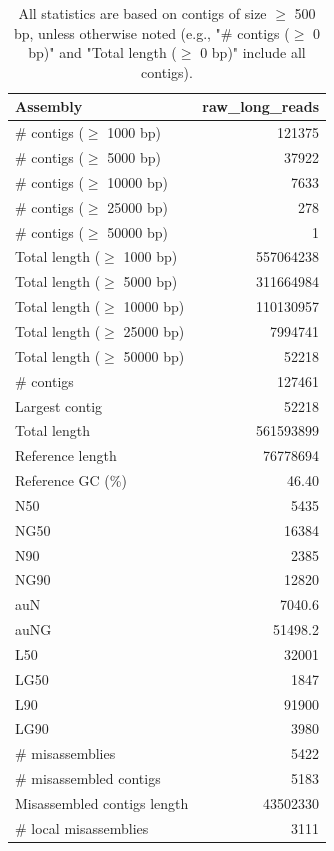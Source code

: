 \documentclass[12pt,a4paper]{article}
\begin{document}
\begin{table}[ht]
\begin{center}
\caption{All statistics are based on contigs of size $\geq$ 500 bp, unless otherwise noted (e.g., "\# contigs ($\geq$ 0 bp)" and "Total length ($\geq$ 0 bp)" include all contigs).}
\begin{tabular}{|l*{1}{|r}|}
\hline
Assembly & raw\_long\_reads \\ \hline
\# contigs ($\geq$ 1000 bp) & 121375 \\ \hline
\# contigs ($\geq$ 5000 bp) & 37922 \\ \hline
\# contigs ($\geq$ 10000 bp) & 7633 \\ \hline
\# contigs ($\geq$ 25000 bp) & 278 \\ \hline
\# contigs ($\geq$ 50000 bp) & 1 \\ \hline
Total length ($\geq$ 1000 bp) & 557064238 \\ \hline
Total length ($\geq$ 5000 bp) & 311664984 \\ \hline
Total length ($\geq$ 10000 bp) & 110130957 \\ \hline
Total length ($\geq$ 25000 bp) & 7994741 \\ \hline
Total length ($\geq$ 50000 bp) & 52218 \\ \hline
\# contigs & 127461 \\ \hline
Largest contig & 52218 \\ \hline
Total length & 561593899 \\ \hline
Reference length & 76778694 \\ \hline
Reference GC (\%) & 46.40 \\ \hline
N50 & 5435 \\ \hline
NG50 & 16384 \\ \hline
N90 & 2385 \\ \hline
NG90 & 12820 \\ \hline
auN & 7040.6 \\ \hline
auNG & 51498.2 \\ \hline
L50 & 32001 \\ \hline
LG50 & 1847 \\ \hline
L90 & 91900 \\ \hline
LG90 & 3980 \\ \hline
\# misassemblies & 5422 \\ \hline
\# misassembled contigs & 5183 \\ \hline
Misassembled contigs length & 43502330 \\ \hline
\# local misassemblies & 3111 \\ \hline

\end{tabular}
\end{center}
\end{table}
\end{document}
